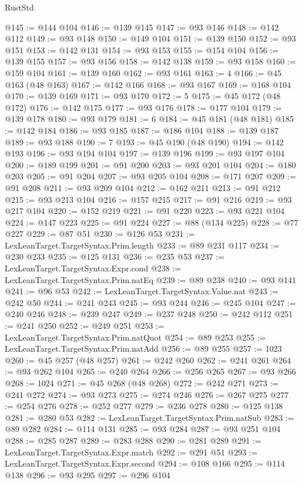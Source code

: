 \begin{lexlean}{RustStd}
\begin{coremodule}
@145 := @144 @104
@146 := @139 @145
@147 := @93 @146
@148 := @142 @112
@149 := @93 @148
@150 := @149 @104
@151 := @139 @150
@152 := @93 @151
@153 := @142 @131
@154 := @93 @153
@155 := @154 @104
@156 := @139 @155
@157 := @93 @156
@158 := @142 @138
@159 := @93 @158
@160 := @159 @104
@161 := @139 @160
@162 := @93 @161
@163 := 4
@166 := @45 @163 (@48 @163)
@167 := @142 @166
@168 := @93 @167
@169 := @168 @104
@170 := @139 @169
@171 := @93 @170
@172 := 5
@175 := @45 @172 (@48 @172)
@176 := @142 @175
@177 := @93 @176
@178 := @177 @104
@179 := @139 @178
@180 := @93 @179
@181 := 6
@184 := @45 @181 (@48 @181)
@185 := @142 @184
@186 := @93 @185
@187 := @186 @104
@188 := @139 @187
@189 := @93 @188
@190 := 7
@193 := @45 @190 (@48 @190)
@194 := @142 @193
@196 := @93 @194 @104
@197 := @139 @196
@199 := @93 @197 @104
@200 := @189 @199
@201 := @91 @200
@203 := @93 @201 @104
@204 := @180 @203
@205 := @91 @204
@207 := @93 @205 @104
@208 := @171 @207
@209 := @91 @208
@211 := @93 @209 @104
@212 := @162 @211
@213 := @91 @212
@215 := @93 @213 @104
@216 := @157 @215
@217 := @91 @216
@219 := @93 @217 @104
@220 := @152 @219
@221 := @91 @220
@223 := @93 @221 @104
@224 := @147 @223
@225 := @91 @224
@227 := @88 (@134 @225)
@228 := @77 @227
@229 := @87 @51
@230 := @126 @53
@231 := LexLeanTarget.TargetSyntax.Prim.length
@233 := @89 @231 @117
@234 := @230 @233
@235 := @125 @131
@236 := @235 @53
@237 := LexLeanTarget.TargetSyntax.Expr.cond
@238 := LexLeanTarget.TargetSyntax.Prim.natEq
@239 := @89 @238
@240 := @93 @141
@241 := @96 @53
@242 := LexLeanTarget.TargetSyntax.Value.nat
@243 := @242 @50
@244 := @241 @243
@245 := @93 @244
@246 := @245 @104
@247 := @240 @246
@248 := @239 @247
@249 := @237 @248
@250 := @242 @112
@251 := @241 @250
@252 := @249 @251
@253 := LexLeanTarget.TargetSyntax.Prim.natQuot
@254 := @89 @253
@255 := LexLeanTarget.TargetSyntax.Prim.natAdd
@256 := @89 @255
@257 := 1023
@260 := @45 @257 (@48 @257)
@261 := @242 @260
@262 := @241 @261
@264 := @93 @262 @104
@265 := @240 @264
@266 := @256 @265
@267 := @93 @266
@268 := 1024
@271 := @45 @268 (@48 @268)
@272 := @242 @271
@273 := @241 @272
@274 := @93 @273
@275 := @274 @246
@276 := @267 @275
@277 := @254 @276
@278 := @252 @277
@279 := @236 @278
@280 := @125 @138
@281 := @280 @53
@282 := LexLeanTarget.TargetSyntax.Prim.natSub
@283 := @89 @282
@284 := @114 @131
@285 := @93 @284
@287 := @93 @251 @104
@288 := @285 @287
@289 := @283 @288
@290 := @281 @289
@291 := LexLeanTarget.TargetSyntax.Expr.match
@292 := @291 @51
@293 := LexLeanTarget.TargetSyntax.Expr.second
@294 := @108 @166
@295 := @114 @138
@296 := @93 @295
@297 := @296 @104

\end{coremodule}
\end{lexlean}

